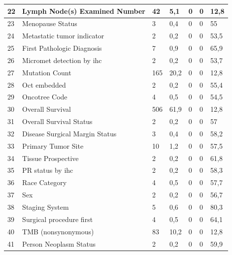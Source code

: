 \begin{table}[hbt!]
\begin{threeparttable}
\begin{tabular}{p{0.5cm} p{4cm} p{1.5cm} p{2cm} p{1.5cm} p{2cm} p{1.5cm}}
			\\ \hline	22	&	Lymph Node(s) Examined Number	&	42	&	5,1	&	0	&	0	&	12,8
			\\ \hline	23	&	Menopause Status	&	3	&	0,4	&	0	&	0	&	55
			\\ \hline	24	&	Metastatic tumor indicator	&	2	&	0,2	&	0	&	0	&	53,5
			\\ \hline	25	&	First Pathologic Diagnosis 	&	7	&	0,9	&	0	&	0	&	65,9
			\\ \hline	26	&	Micromet detection by ihc	&	2	&	0,2	&	0	&	0	&	53,7
			\\ \hline	27	&	Mutation Count	&	165	&	20,2	&	0	&	0	&	12,8
			\\ \hline	28	&	Oct embedded	&	2	&	0,2	&	0	&	0	&	55,4
			\\ \hline	29	&	Oncotree Code	&	4	&	0,5	&	0	&	0	&	54,5
			\\ \hline	30	&	Overall Survival	&	506	&	61,9	&	0	&	0	&	12,8
			\\ \hline	31	&	Overall Survival Status	&	2	&	0,2	&	0	&	0	&	57
			\\ \hline	32	&	Disease Surgical Margin Status	&	3	&	0,4	&	0	&	0	&	58,2
			\\ \hline	33	&	Primary Tumor Site	&	10	&	1,2	&	0	&	0	&	57,5
			\\ \hline	34	&	Tissue Prospective 	&	2	&	0,2	&	0	&	0	&	61,8
			\\ \hline   35	&	PR status by ihc	&	2	&	0,2	&	0	&	0	&	58,3
			\\ \hline	36	&	Race Category	&	4	&	0,5	&	0	&	0	&	57,7
			\\ \hline	37	&	Sex	&	2	&	0,2	&	0	&	0	&	56,7
			\\ \hline	38	&	Staging System	&	5	&	0,6	&	0	&	0	&	80,3
			\\ \hline	39	&	Surgical procedure first	&	4	&	0,5	&	0	&	0	&	64,1
			\\ \hline	40	&	TMB (nonsynonymous)	&	83	&	10,2	&	0	&	0	&	12,8
			\\ \hline	41	&	Person Neoplasm Status	&	2	&	0,2	&	0	&	0	&	59,9
			\\ \hline
		\end{tabular}
	\end{threeparttable}
\end{table}

\clearpage